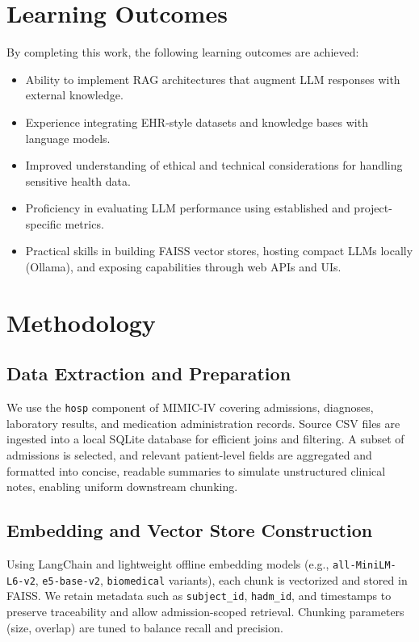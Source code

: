 \section{Learning Outcomes}
By completing this work, the following learning outcomes are achieved:
\begin{itemize}
  \item Ability to implement RAG architectures that augment LLM responses with external knowledge.
  \item Experience integrating EHR-style datasets and knowledge bases with language models.
  \item Improved understanding of ethical and technical considerations for handling sensitive health data.
  \item Proficiency in evaluating LLM performance using established and project-specific metrics.
  \item Practical skills in building FAISS vector stores, hosting compact LLMs locally (Ollama), and exposing capabilities through web APIs and UIs.
\end{itemize}

\section{Methodology}
\subsection{Data Extraction and Preparation}
We use the \texttt{hosp} component of MIMIC-IV covering admissions, diagnoses, laboratory results, and medication administration records. Source CSV files are ingested into a local SQLite database for efficient joins and filtering. A subset of admissions is selected, and relevant patient-level fields are aggregated and formatted into concise, readable summaries to simulate unstructured clinical notes, enabling uniform downstream chunking.

\subsection{Embedding and Vector Store Construction}
Using LangChain and lightweight offline embedding models (e.g., \texttt{all-MiniLM-L6-v2}, \texttt{e5-base-v2}, \texttt{biomedical} variants), each chunk is vectorized and stored in FAISS. We retain metadata such as \texttt{subject\_id}, \texttt{hadm\_id}, and timestamps to preserve traceability and allow admission-scoped retrieval. Chunking parameters (size, overlap) are tuned to balance recall and precision.

